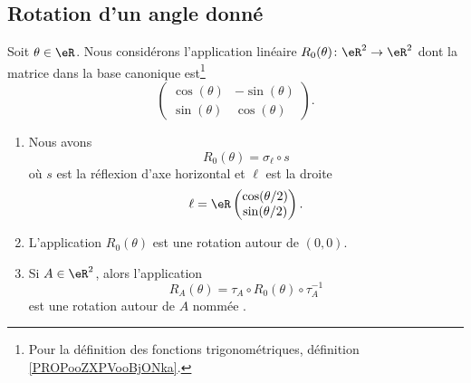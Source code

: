 \subsection{Rotation d'un angle donné}

\begin{lemmaDef}        \label{DEFooADTDooKIZbrw}
	Soit \( \theta\in \eR\). Nous considérons l'application linéaire \( R_0(\theta)\colon \eR^2\to \eR^2\) dont la matrice dans la base canonique est\footnote{Pour la définition des fonctions trigonométriques, définition \ref{PROPooZXPVooBjONka}.}
	\begin{equation}
		\begin{pmatrix}
			\cos(\theta) & -\sin(\theta) \\
			\sin(\theta) & \cos(\theta)
		\end{pmatrix}.
	\end{equation}
	\begin{enumerate}
		\item       \label{ITEMooIEKJooZfsAui}
		      Nous avons
		      \begin{equation}        \label{EQooEVCTooBpTDDq}
			      R_0(\theta)=\sigma_{\ell}\circ s
		      \end{equation}
		      où \( s\) est la réflexion d'axe horizontal et \( \ell\) est la droite
		      \begin{equation}
			      \ell=\eR\begin{pmatrix}
				      \cos(\theta/2) \\
				      \sin(\theta/2)
			      \end{pmatrix}.
		      \end{equation}
		\item       \label{ITEMooBEYOooMHRRYk}
		      L'application \( R_0(\theta)\) est une rotation autour de \( (0,0)\).
		\item     \label{ITEMooEQPAooQcsYfj}
		      Si \( A\in \eR^2\), alors l'application
		      \begin{equation}      \label{EQooKMJQooWGvWHe}
			      R_A(\theta)=\tau_A\circ R_0(\theta)\circ \tau_A^{-1}
		      \end{equation}
		      est une rotation autour de \( A\) nommée .
	\end{enumerate}
\end{lemmaDef}


